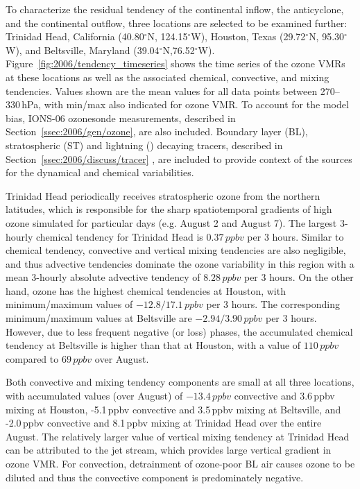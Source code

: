 To characterize the residual tendency of the continental inflow, the anticyclone, and the continental outflow, three locations are selected to be
examined further: Trinidad Head, California (40.80$^\circ$N, 124.15$^\circ$W), Houston, Texas (29.72$^\circ$N, 95.30$^\circ$W),
and Beltsville, Maryland (39.04$^\circ$N,76.52$^\circ$W). Figure~\ref{fig:2006/tendency_timeseries} shows the time series of the
ozone VMRs at these locations as well as the associated chemical, convective, and mixing tendencies. Values shown are the mean values for
all data points between 270--330\,\unit{hPa}, with min/max also indicated for ozone VMR.
To account for the model bias, IONS-06 ozonesonde measurements, described in Section~\ref{ssec:2006/gen/ozone}, are also included.
Boundary layer (BL), stratospheric (ST) and lightning (\lnox) decaying tracers, described in Section~\ref{ssec:2006/discuss/tracer}
, are included to provide context of the sources for the dynamical and chemical variabilities.

Trinidad Head periodically receives stratospheric ozone from the northern latitudes, which is responsible for the sharp spatiotemporal gradients
of high ozone simulated for particular days (e.g. August 2 and August 7). The largest 3-hourly chemical tendency for Trinidad Head is
$0.37\,\unit{ppbv}$ per 3 hours. Similar to chemical tendency, convective and vertical mixing tendencies are also negligible, and thus advective tendencies dominate
the ozone variability in this region with a mean 3-hourly absolute advective tendency of $8.28\,\unit{ppbv}$ per 3 hours. On the other hand,
ozone has the highest chemical tendencies at Houston, with minimum/maximum values of
$-12.8/17.1\,\unit{ppbv}$ per 3 hours. The corresponding minimum/maximum values at Beltsville are $-2.94/3.90\,\unit{ppbv}$ per 3 hours. However, due to less frequent
negative (or loss) phases, the accumulated chemical tendency at Beltsville is higher than that at Houston, with a value of $110\,\unit{ppbv}$
compared to $69\,\unit{ppbv}$ over August.

Both convective and mixing tendency components are small at all three locations, with accumulated values (over August) of $-13.4\,\unit{ppbv}$ convective
and 3.6\,\unit{ppbv} mixing at Houston, -5.1\,\unit{ppbv} convective and 3.5\,\unit{ppbv} mixing at Beltsville, and -2.0\,\unit{ppbv} convective and
8.1\,\unit{ppbv} mixing at Trinidad Head over the entire August. The relatively larger value of vertical mixing tendency at Trinidad Head can be
attributed to the jet stream, which provides large vertical gradient in ozone VMR. For convection, detrainment of ozone-poor BL
air causes ozone to be diluted and thus the convective component is predominately negative.

